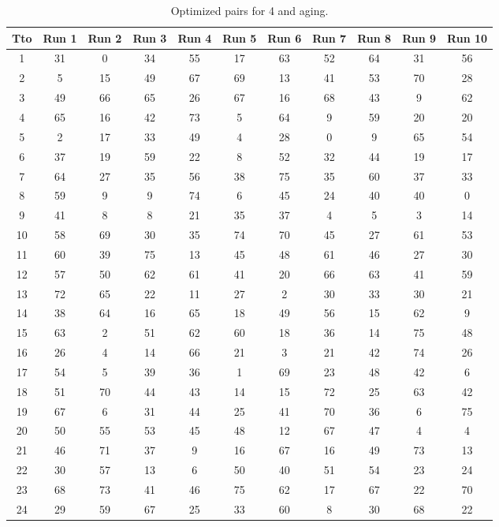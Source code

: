 \begin{table}
  \centering
  \scriptsize
  \caption{Optimized pairs for 4 and aging.}
  \label{tab_pairs}
\begin{tabular}{c c c c c c c c c c c }
\hline
Tto & Run 1 & Run 2 & Run 3 & Run 4 & Run 5 & Run 6 & Run 7 & Run 8 & Run 9 & Run 10 \\
\hline
1 & 31 & 0 & 34 & 55 & 17 & 63 & 52 & 64 & 31 & 56 \\
2 & 5 & 15 & 49 & 67 & 69 & 13 & 41 & 53 & 70 & 28 \\
3 & 49 & 66 & 65 & 26 & 67 & 16 & 68 & 43 & 9 & 62 \\
4 & 65 & 16 & 42 & 73 & 5 & 64 & 9 & 59 & 20 & 20 \\
5 & 2 & 17 & 33 & 49 & 4 & 28 & 0 & 9 & 65 & 54 \\
6 & 37 & 19 & 59 & 22 & 8 & 52 & 32 & 44 & 19 & 17 \\
7 & 64 & 27 & 35 & 56 & 38 & 75 & 35 & 60 & 37 & 33 \\
8 & 59 & 9 & 9 & 74 & 6 & 45 & 24 & 40 & 40 & 0 \\
9 & 41 & 8 & 8 & 21 & 35 & 37 & 4 & 5 & 3 & 14 \\
10 & 58 & 69 & 30 & 35 & 74 & 70 & 45 & 27 & 61 & 53 \\
11 & 60 & 39 & 75 & 13 & 45 & 48 & 61 & 46 & 27 & 30 \\
12 & 57 & 50 & 62 & 61 & 41 & 20 & 66 & 63 & 41 & 59 \\
13 & 72 & 65 & 22 & 11 & 27 & 2 & 30 & 33 & 30 & 21 \\
14 & 38 & 64 & 16 & 65 & 18 & 49 & 56 & 15 & 62 & 9 \\
15 & 63 & 2 & 51 & 62 & 60 & 18 & 36 & 14 & 75 & 48 \\
16 & 26 & 4 & 14 & 66 & 21 & 3 & 21 & 42 & 74 & 26 \\
17 & 54 & 5 & 39 & 36 & 1 & 69 & 23 & 48 & 42 & 6 \\
18 & 51 & 70 & 44 & 43 & 14 & 15 & 72 & 25 & 63 & 42 \\
19 & 67 & 6 & 31 & 44 & 25 & 41 & 70 & 36 & 6 & 75 \\
20 & 50 & 55 & 53 & 45 & 48 & 12 & 67 & 47 & 4 & 4 \\
21 & 46 & 71 & 37 & 9 & 16 & 67 & 16 & 49 & 73 & 13 \\
22 & 30 & 57 & 13 & 6 & 50 & 40 & 51 & 54 & 23 & 24 \\
23 & 68 & 73 & 41 & 46 & 75 & 62 & 17 & 67 & 22 & 70 \\
24 & 29 & 59 & 67 & 25 & 33 & 60 & 8 & 30 & 68 & 22 \\

\end{tabular}
\end{table}
